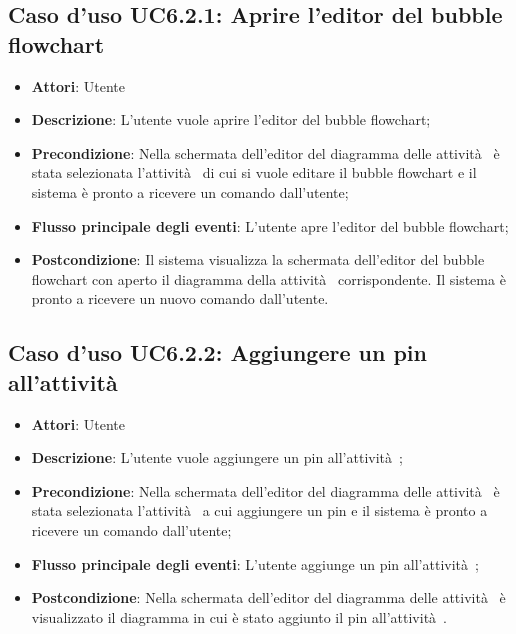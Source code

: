 \documentclass[../AnalisiDeiRequisiti.tex]{subfiles}
\begin{document}
				\subsection{Caso d'uso UC6.2.1: Aprire l'editor del bubble flowchart}
				\begin{itemize}
					\item \textbf{Attori}: Utente
					\item \textbf{Descrizione}: L'utente vuole aprire l'editor del bubble flowchart; 
					\item \textbf{Precondizione}: Nella schermata dell'editor del diagramma delle attività  è stata selezionata l'attività  di cui si vuole editare il bubble flowchart e il sistema è pronto a ricevere un comando dall'utente;
					\item \textbf{Flusso principale degli eventi}: L'utente apre l'editor del bubble flowchart;
					\item \textbf{Postcondizione}: Il sistema visualizza la schermata dell'editor del bubble flowchart con aperto il diagramma della attività  corrispondente. Il sistema è pronto a ricevere un nuovo comando dall'utente.
				\end{itemize}
				\subsection{Caso d'uso UC6.2.2: Aggiungere un pin all'attività }
				\begin{itemize}
					\item \textbf{Attori}: Utente
					\item \textbf{Descrizione}: L'utente vuole aggiungere un pin all'attività ;
					\item \textbf{Precondizione}: Nella schermata dell'editor del diagramma delle attività  è stata selezionata l'attività  a cui aggiungere un pin e il sistema è pronto a ricevere un comando dall'utente;
					\item \textbf{Flusso principale degli eventi}: L'utente aggiunge un pin all'attività ;
					\item \textbf{Postcondizione}: Nella schermata dell'editor del diagramma delle attività  è visualizzato il diagramma in cui è stato aggiunto il pin all'attività .
				\end{itemize}
\end{document}
